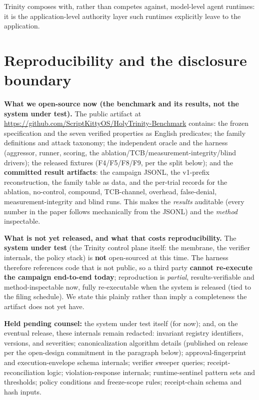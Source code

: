 \documentclass[11pt]{article}
\begin{document}
Trinity composes with, rather than competes against, model-level agent runtimes: it is the
application-level authority layer such runtimes explicitly leave to the application.

\section{Reproducibility and the disclosure boundary}\label{reproducibility-and-the-disclosure-boundary}

\textbf{What we open-source now (the benchmark and its results, not the system under test).} The
public artifact at \url{https://github.com/ScriptKittyOS/HolyTrinity-Benchmark} contains: the frozen
specification and the seven verified properties as English predicates; the family definitions
and attack taxonomy; the independent oracle and the harness (aggressor, runner, scoring, the
ablation/TCB/measurement-integrity/blind drivers); the released fixtures (F4/F5/F8/F9, per the
split below); and the \textbf{committed result artifacts}: the campaign JSONL, the v1-prefix
reconstruction, the family table as data, and the per-trial records for the ablation, no-control,
compound, TCB-channel, overhead, false-denial, measurement-integrity and blind runs. This makes the
\emph{results} auditable (every number in the paper follows mechanically from the JSONL) and the
\emph{method} inspectable.

\textbf{What is not yet released, and what that costs reproducibility.} The \textbf{system under test}
(the Trinity control plane itself: the membrane, the verifier internals, the policy stack)
is \textbf{not} open-sourced at this time. The harness therefore references code that is not public,
so a third party \textbf{cannot re-execute the campaign end-to-end today}; reproduction is
\emph{partial}, results-verifiable and method-inspectable now, fully re-executable when the system
is released (tied to the filing schedule). We state this plainly rather than imply a
completeness the artifact does not yet have.

\textbf{Held pending counsel:} the system under test itself (for now); and, on the eventual
release, these internals remain redacted: invariant registry identifiers, versions, and
severities; canonicalization algorithm details (published on release per the open-design
commitment in the paragraph below); approval-fingerprint and execution-envelope schema
internals; verifier sweeper queries; receipt-reconciliation logic; violation-response
internals; runtime-sentinel pattern sets and thresholds; policy conditions and freeze-scope
rules; receipt-chain schema and hash inputs.
\end{document}
